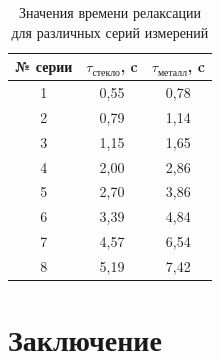 \documentclass[12pt,a4paper]{article}
\begin{document}
\begin{table}[h!]
\centering
\begin{tabular}{|c|c|c|}
\hline
№ серии & $\tau_{\text{стекло}}$, c & $\tau_{\text{металл}}$, c \\ \hline
1       & 0,55                   & 0,78                  \\ \hline
2       & 0,79                   & 1,14                  \\ \hline
3       & 1,15                   & 1,65                  \\ \hline
4       & 2,00                   & 2,86                  \\ \hline
5       & 2,70                   & 3,86                  \\ \hline
6       & 3,39                   & 4,84                  \\ \hline
7       & 4,57                   & 6,54                  \\ \hline
8       & 5,19                   & 7,42                  \\ \hline
\end{tabular}
\caption{Значения времени релаксации для различных серий измерений}
\label{tab:relax_time}
\end{table}

\section{Заключение}
\end{document}
